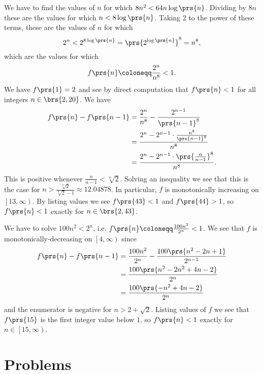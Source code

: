 \documentclass[oneside]{scrbook}
\theoremstyle{definition}
\begin{document}
\begin{exercise}
    We have to find the values of $n$ for which $8n^2 < 64 n \log\prs{n}$. Dividing by $8n$ these are the values for which $n < 8 \log\prs{n}$. Taking $2$ to the power of these terms, these are the values of $n$ for which \[2^n < 2^{8 \log\prs{n}} = \prs{2^{\log\prs{n}}}^8 = n^8 \text{,}\]
    which are the values for which \[f\prs{n} \coloneqq \frac{2^n}{n^8} < 1 \text{.}\]
    We have $f\prs{1} = 2$ and see by direct computation that $f\prs{n} < 1$ for all integers $n \in \brs{2,20}$. We have
    \begin{align*}
    f\prs{n} - f\prs{n-1} &= \frac{2^n}{n^8} - \frac{2^{n-1}}{\prs{n-1}^8}
    \\&=
    \frac{2^n - 2^{n-1} \cdot \frac{n^8}{\prs{n-1}^8}}{n^8}
    \\&=
    \frac{2^n - 2^{n-1} \cdot \prs{\frac{n}{n-1}}^8}{n^8} \text{.}
    \end{align*}
    This is positive whenever $\frac{n}{n-1} < \sqrt[8]{2}$. Solving an inequality we see that this is the case for $n > \frac{\sqrt[8]{2}}{\sqrt[8]{2} - 1} \approx 12.04878$. In particular, $f$ is monotonically increasing on $\left[13, \infty\right)$. By listing values we see $f\prs{43} < 1$ and $f\prs{44} > 1$, so $f\prs{n} < 1$ exactly for $n \in \brs{2, 43}$.
\end{exercise}

\begin{exercise}
    We have to solve $100 n^2 < 2^n$, i.e. $f\prs{n} \coloneqq \frac{100 n^2}{2^n} < 1$. We see that $f$ is monotonically-decreasing on $\left[4,\infty\right)$ since
    \begin{align*}
    f\prs{n} - f\prs{n-1} &= \frac{100 n^2}{2^n} - \frac{100 \prs{n^2 - 2n + 1}}{2^{n-1}}
    \\&= \frac{100\prs{n^2 - 2n^2 + 4n - 2}}{2^n}
    \\&= \frac{100 \prs{-n^2 + 4n - 2}}{2^n}
    \end{align*}
    and the enumerator is negative for $n > 2 + \sqrt{2}$.
    Listing values of $f$ we see that $f\prs{15}$ is the first integer value below $1$, so $f\prs{n} < 1$ exactly for $n \in \left[15, \infty\right)$.
\end{exercise}

\section*{Problems}
\end{document}
